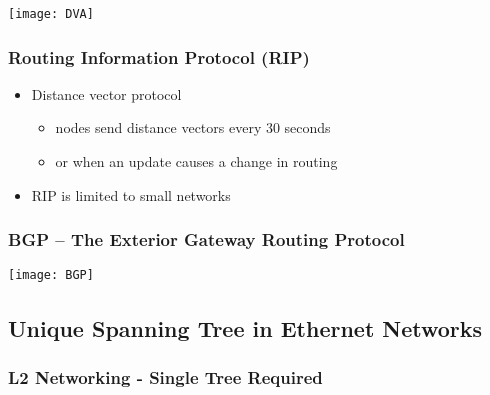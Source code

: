 \documentclass[../resumosRCOM.tex]{subfiles}
\begin{document}
\begin{center}
    \texttt{[image: DVA]}    
\end{center}

\subsubsection{Routing Information Protocol (RIP)}

\begin{itemize}
    \item Distance vector protocol
    \begin{itemize}
        \item nodes send distance vectors every 30 seconds
        \item or when an update causes a change in routing
    \end{itemize}
    \item RIP is limited to small networks
\end{itemize}

\subsubsection{BGP – The Exterior Gateway Routing Protocol}

\begin{center}
    \texttt{[image: BGP]}
\end{center}

\subsection{Unique Spanning Tree in Ethernet Networks}

\subsubsection{L2 Networking - Single Tree Required}
\end{document}
